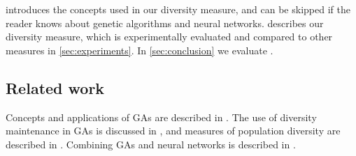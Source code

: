 introduces the concepts used in our diversity measure, and can be skipped if the reader knows about genetic algorithms and neural networks.  describes our diversity measure, which is experimentally evaluated and compared to other measures in \cref{sec:experiments}. In \cref{sec:conclusion} we evaluate \dia.

\subsection{Related work}
Concepts and applications of GAs are described in \cite{Cobb93geneticalgorithms,DeJong:1975:ABC:907087,Luke2013Metaheuristics,Syswerda:1989:UCG:645512.657265,ursem2002diversity,fogarty,Whitley:1989:GAS:93126.93169,1250187}. The use of diversity maintenance in GAs is discussed in \cite{diaz2007empirical,Zitzler00comparisonof,Darwen00doesextra,1266373}, and measures of population diversity are described in \cite{Nguyen:2006:ASPGP,simpson1949measurement}. Combining GAs and neural networks is described in \cite{masterThesisGANN}.
